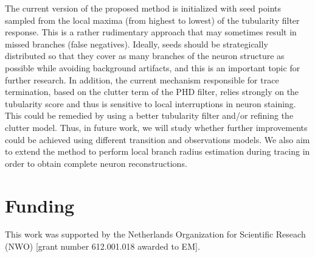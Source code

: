 \documentclass[noinfo,nocrop,final]{bioinfo}
\begin{document}
The current version of the proposed method is initialized with seed points sampled from the local maxima (from highest to lowest) of the tubularity filter response. This is a rather rudimentary approach that may sometimes result in missed branches (false negatives). Ideally, seeds should be strategically distributed so that they cover as many branches of the neuron structure as possible while avoiding background artifacts, and this is an important topic for further research. In addition, the current mechanism responsible for trace termination, based on the clutter term of the PHD filter, relies strongly on the tubularity score and thus is sensitive to local interruptions in neuron staining. This could be remedied by using a better tubularity filter and/or refining the clutter model. Thus, in future work, we will study whether further improvements could be achieved using different transition and observations models. We also aim to extend the method to perform local branch radius estimation during tracing in order to obtain complete neuron reconstructions.

\section*{Funding}
This work was supported by the Netherlands Organization for Scientific Reseach (NWO) [grant number 612.001.018 awarded to EM].



\end{document}
